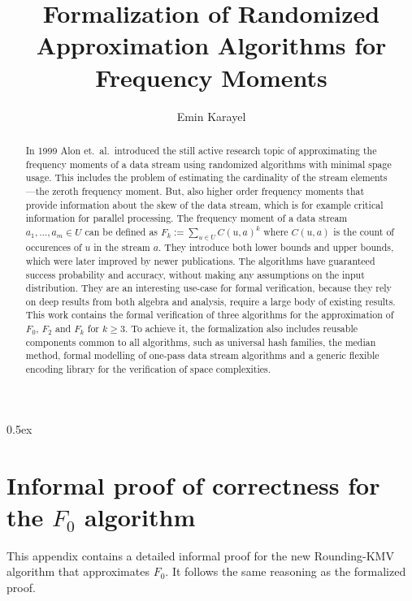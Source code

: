 \documentclass[11pt,a4paper]{article}
\begin{document}
\title{Formalization of Randomized Approximation Algorithms for Frequency Moments}
\author{Emin Karayel}
\maketitle
\begin{abstract}
In 1999 Alon et.\ al.\ introduced the still active research topic of approximating the frequency moments of a data stream using randomized algorithms with minimal spage usage.
This includes the problem of estimating the cardinality of the stream elements---the zeroth frequency moment.
But, also higher order frequency moments that provide information about the skew of the data stream, which is for example critical information for parallel processing.
The frequency moment of a data stream $a_1, \ldots, a_m \in U$ can be defined as $F_k := \sum_{u \in U} C(u,a)^k$ where $C(u,a)$ is the count of occurences of $u$ in the stream $a$.
They introduce both lower bounds and upper bounds, which were later improved by newer publications.
The algorithms have guaranteed success probability and accuracy, without making any assumptions on the input distribution.
They are an interesting use-case for formal verification, because they rely on deep results from both algebra and analysis, require a large body of existing results.
This work contains the formal verification of three algorithms for the approximation of $F_0$, $F_2$ and $F_k$ for $k \geq 3$.
To achieve it, the formalization also includes reusable components common to all algorithms, such as universal hash families, the median method, formal modelling of one-pass data stream algorithms and a generic flexible encoding library for the verification of space complexities.
\end{abstract}

\tableofcontents

\parindent 0pt\parskip 0.5ex


\appendix
\section{Informal proof of correctness for the $F_0$ algorithm\label{sec:f0_proof}}
This appendix contains a detailed informal proof for the new Rounding-KMV algorithm that approximates $F_0$. It follows the same reasoning as the formalized proof.
\end{document}
